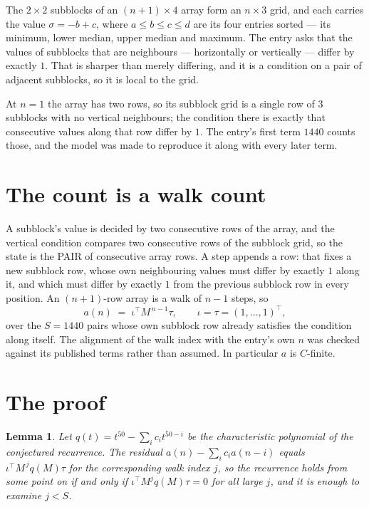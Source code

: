 \documentclass[11pt,a4paper]{article}
\theoremstyle{plain}
\newtheorem{lemma}[theorem]{Lemma}
\theoremstyle{definition}
\begin{document}
The $2\times2$ subblocks of an $(n+1)\times4$ array form an
$n\times3$ grid, and each carries the value $\sigma=-b+c$, where $a\le b\le c\le d$ are its four entries sorted --- its minimum, lower median, upper median and maximum. The entry asks that the values of
subblocks that are neighbours --- horizontally or vertically --- differ by exactly $1$.
That is sharper than merely differing, and it is a condition on a pair of adjacent subblocks,
so it is local to the grid.

At $n=1$ the array has two rows, so its subblock grid is a single row of $3$ subblocks with
no vertical neighbours; the condition there is exactly that consecutive values along that row
differ by $1$. The entry's first term $1440$ counts those, and the model was made to
reproduce it along with every later term.

\section{The count is a walk count}

A subblock's value is decided by two consecutive rows of the array, and the
vertical condition compares two consecutive rows of the subblock grid, so the state is the
PAIR of consecutive array rows. A step appends a row: that fixes a new subblock row, whose own
neighbouring values must differ by exactly $1$ along it, and which must differ by exactly
$1$ from the previous subblock row in every position. An $(n+1)$-row array is a walk of
$n-1$ steps, so
\[
a(n)\;=\;\iota^{\!\top}M^{\,n-1}\tau,\qquad\iota=\tau=(1,\dots,1)^{\!\top},
\]
over the $S=1440$ pairs whose own subblock row already satisfies the condition along itself.
The alignment of the walk index with the entry's own $n$ was checked against its published
terms rather than assumed. In particular $a$ is $C$-finite.

\section{The proof}

\begin{lemma}\label{lem:crit}
Let $q(t)=t^{50}-\sum_i c_it^{50-i}$ be the characteristic polynomial of the
conjectured recurrence. The residual $a(n)-\sum_ic_ia(n-i)$ equals
$\iota^{\!\top}M^{\,j}q(M)\tau$ for the corresponding walk index $j$, so the recurrence
holds from some point on if and only if $\iota^{\!\top}M^{j}q(M)\tau=0$ for all large $j$,
and it is enough to examine $j<S$.
\end{lemma}
\end{document}
